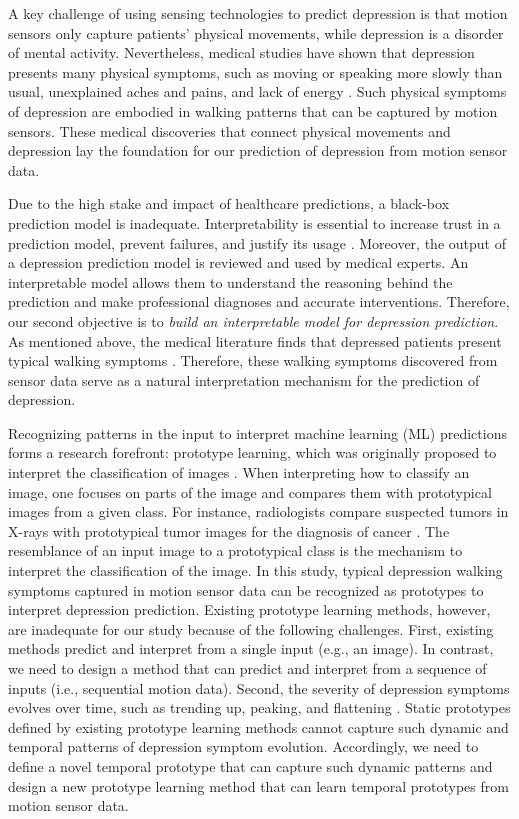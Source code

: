 \documentclass[mnsc]{informs3b} %
\begin{document}
A key challenge of using sensing technologies to predict depression is that motion sensors only capture patients’ physical movements, while depression is a disorder of mental activity. Nevertheless, medical studies have shown that depression presents many physical symptoms, such as moving or speaking more slowly than usual, unexplained aches and pains, and lack of energy \citep{nhs_symptoms_2022, sloman_gait_1982,lemke_spatiotemporal_2000}. Such physical symptoms of depression are embodied in walking patterns that can be captured by motion sensors. These medical discoveries that connect physical movements and depression lay the foundation for our prediction of depression from motion sensor data.

Due to the high stake and impact of healthcare predictions, a black-box prediction model is inadequate. Interpretability is essential to increase trust in a prediction model, prevent failures, and justify its usage \citep{moss_demystifying_2022}. Moreover, the output of a depression prediction model is reviewed and used by medical experts. An interpretable model allows them to understand the reasoning behind the prediction and make professional diagnoses and accurate interventions. Therefore, our second objective is to \textit{build an interpretable model for depression prediction}. As mentioned above, the medical literature finds that depressed patients present typical walking symptoms \citep{nhs_symptoms_2022}. Therefore, these walking symptoms discovered from sensor data serve as a natural interpretation mechanism for the prediction of depression.

Recognizing patterns in the input to interpret machine learning (ML) predictions forms a research forefront: prototype learning, which was originally proposed to interpret the classification of images \citep{chen_this_2019}. When interpreting how to classify an image, one focuses on parts of the image and compares them with prototypical images from a given class. For instance, radiologists compare suspected tumors in X-rays with prototypical tumor images for the diagnosis of cancer \citep{chen_this_2019}. The resemblance of an input image to a prototypical class is the mechanism to interpret the classification of the image. In this study, typical depression walking symptoms captured in motion sensor data can be recognized as prototypes to interpret depression prediction.
Existing prototype learning methods, however, are inadequate for our study because of the following challenges. 
First, existing methods predict and interpret from a single input (e.g., an image). In contrast, we need to design a method that can predict and interpret from a sequence of inputs (i.e., sequential motion data). Second, the severity of depression symptoms evolves over time, such as trending up, peaking, and flattening \citep{dattani_mental_2021}. Static prototypes defined by existing prototype learning methods cannot capture such dynamic and temporal patterns of depression symptom evolution.  
Accordingly, we need to define a novel temporal prototype that can capture such dynamic patterns and design a new prototype learning method that can learn temporal prototypes from motion sensor data.
\end{document}
